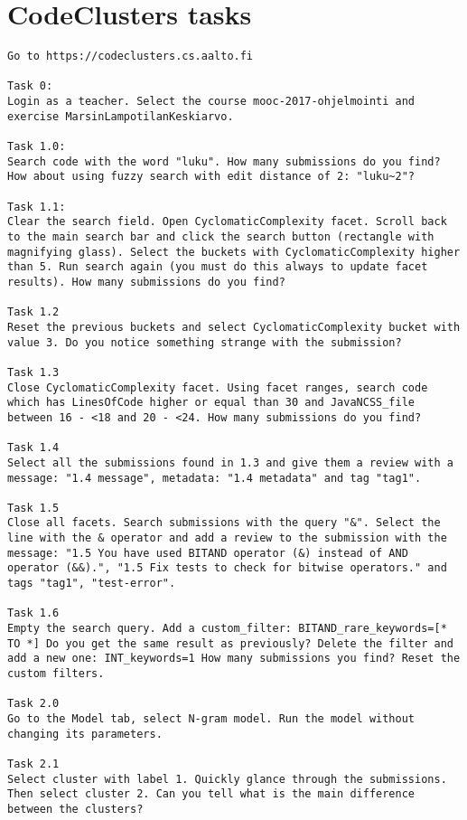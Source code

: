 \chapter{CodeClusters tasks}
\label{appendix:cc-tasks}

\begin{lstlisting}
Go to https://codeclusters.cs.aalto.fi

Task 0:
Login as a teacher. Select the course mooc-2017-ohjelmointi and exercise MarsinLampotilanKeskiarvo.

Task 1.0:
Search code with the word "luku". How many submissions do you find? How about using fuzzy search with edit distance of 2: "luku~2"?

Task 1.1:
Clear the search field. Open CyclomaticComplexity facet. Scroll back to the main search bar and click the search button (rectangle with magnifying glass). Select the buckets with CyclomaticComplexity higher than 5. Run search again (you must do this always to update facet results). How many submissions do you find?

Task 1.2
Reset the previous buckets and select CyclomaticComplexity bucket with value 3. Do you notice something strange with the submission?

Task 1.3
Close CyclomaticComplexity facet. Using facet ranges, search code which has LinesOfCode higher or equal than 30 and JavaNCSS_file between 16 - <18 and 20 - <24. How many submissions do you find?

Task 1.4
Select all the submissions found in 1.3 and give them a review with a message: "1.4 message", metadata: "1.4 metadata" and tag "tag1".

Task 1.5
Close all facets. Search submissions with the query "&". Select the line with the & operator and add a review to the submission with the message: "1.5 You have used BITAND operator (&) instead of AND operator (&&).", "1.5 Fix tests to check for bitwise operators." and tags "tag1", "test-error".

Task 1.6
Empty the search query. Add a custom_filter: BITAND_rare_keywords=[* TO *] Do you get the same result as previously? Delete the filter and add a new one: INT_keywords=1 How many submissions you find? Reset the custom filters.

Task 2.0
Go to the Model tab, select N-gram model. Run the model without changing its parameters. 

Task 2.1
Select cluster with label 1. Quickly glance through the submissions. Then select cluster 2. Can you tell what is the main difference between the clusters?


\end{lstlisting}
